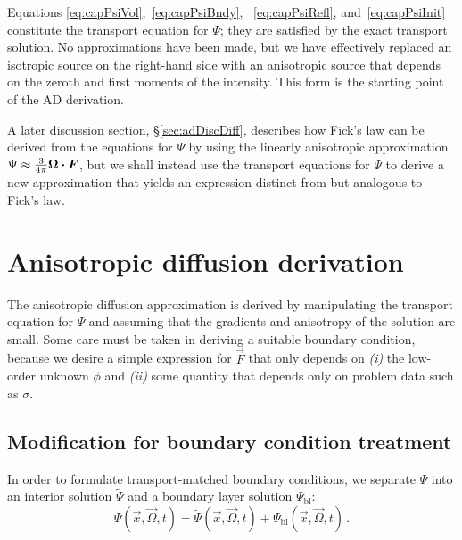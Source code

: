 Equations \eqref{eq:capPsiVol},~\eqref{eq:capPsiBndy},%
~\eqref{eq:capPsiRefl}, and~\eqref{eq:capPsiInit} constitute the transport
equation for $\Psi$; they are satisfied by the exact transport solution. No
approximations have been made, but we have effectively replaced an isotropic
source on the right-hand side with an anisotropic source that depends on
the zeroth and first moments of the intensity. This form is the starting point of the AD
derivation.

A later discussion section, \S\ref{sec:adDiscDiff}, describes how Fick's law can
be derived from the equations for $\Psi$
by using the linearly anisotropic approximation \mbox{$\Psi\approx \frac{3}{4\pi}
\bm{\Omega}\bm{\cdot}\bm{F}$}, but we shall instead use the transport
equations for $\Psi$ to
derive a new approximation that yields an expression distinct from but 
analogous to Fick's law.

\section{Anisotropic diffusion derivation}\label{sec:adDerivation}
The anisotropic diffusion approximation is derived by manipulating the
transport equation for $\Psi$ and assuming that the gradients and anisotropy
of the solution are small. Some care must be taken in deriving
a suitable boundary condition, because we desire a simple expression for
$\vec{F}$ that only depends on \textsl{(i)} the low-order unknown $\phi$ and
\textsl{(ii)} some quantity that depends only
on problem data such as $\sigma$.

\subsection{Modification for boundary condition treatment}
In order to formulate transport-matched boundary conditions, we separate $\Psi$
into an interior solution $\tilde\Psi$ and a boundary layer solution
$\Psi_\mathrm{bl}$:
\begin{equation} \label{eq:boundaryLayerPsi}
  \Psi(\vec{x}, \vec{\Omega}, t)
  = \tilde\Psi(\vec{x}, \vec{\Omega}, t)
  + \Psi_\mathrm{bl}(\vec{x}, \vec{\Omega}, t)\,.
\end{equation}

